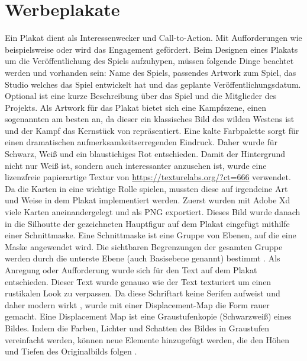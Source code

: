 \section{Werbeplakate}\label{sec:trailer}

\renewcommand{\kapitelautor}{Autor: Markus Böheim}

Ein Plakat dient als Interessenwecker und Call-to-Action. Mit Aufforderungen wie beispielsweise
 oder  wird das Engagement gefördert.
Beim Designen eines Plakats um die Veröffentlichung des Spiels aufzuhypen, müssen folgende Dinge beachtet werden und vorhanden sein: Name des Spiels, passendes Artwork zum Spiel, das Studio welches das Spiel entwickelt hat und das geplante Veröffentlichungsdatum. Optional ist eine kurze Beschreibung über das Spiel und die Mitglieder des Projekts.
Als Artwork für das Plakat bietet sich eine Kampfszene, einen sogenannten  am besten an, da dieser
ein klassisches Bild des wilden Westens ist und der Kampf das Kernstück von \FF repräsentiert. Eine kalte Farbpalette
sorgt für einen dramatischen aufmerksamkeitserregenden Eindruck. Daher wurde für Schwarz, Weiß und ein blaustichiges Rot
entschieden. Damit der Hintergrund nicht nur Weiß ist, sondern auch interessanter
anzusehen ist, wurde eine lizenzfreie papierartige Textur von \url{https://texturelabs.org/?ct=666} verwendet. Da die
Karten in \FF eine wichtige Rolle spielen, mussten diese auf irgendeine Art und Weise in dem Plakat implementiert
werden. Zuerst wurden mit Adobe Xd viele Karten aneinandergelegt und als PNG exportiert. Dieses Bild wurde danach in
die Silhoutte der gezeichneten Hauptfigur auf dem Plakat eingefügt mithilfe einer Schnittmaske. Eine Schnittmaske ist
eine Gruppe von Ebenen, auf die eine Maske angewendet wird. Die sichtbaren Begrenzungen der gesamten Gruppe werden
durch die unterste Ebene (auch Basisebene genannt) bestimmt . Als Anregung oder Aufforderung wurde
sich für den Text
 auf dem Plakat entschieden. Dieser Text wurde genauso wie der Text
 texturiert um einen rustikalen Look zu verpassen. Da diese Schriftart keine Serifen aufweist und
daher modern wirkt  , wurde mit einer Displacement-Map die Form rauer gemacht. Eine Displacement Map ist eine
Graustufenkopie (Schwarzweiß) eines Bildes. Indem die Farben, Lichter und Schatten des Bildes in Graustufen
vereinfacht werden, können neue Elemente hinzugefügt werden, die den Höhen und Tiefen des Originalbilds folgen .
